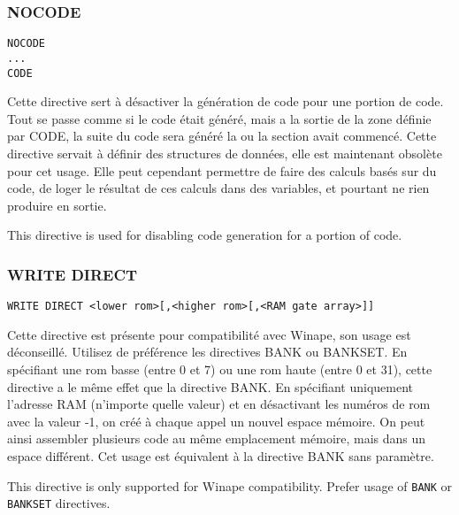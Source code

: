 \subsubsection{NOCODE}
\begin{verbatim}
NOCODE
...
CODE
\end{verbatim}

\begin{xfr}
  Cette directive sert à désactiver la génération de code pour une portion de code. Tout se passe comme si le code était généré, mais a la sortie de la zone définie par CODE, la suite du code sera généré la ou la section avait commencé.
  Cette directive servait à définir des structures de données, elle est maintenant obsolète pour cet usage. Elle peut cependant permettre de faire des calculs basés sur du code, de loger le résultat de ces calculs dans des variables, et pourtant ne rien produire en sortie.
\end{xfr}

\begin{xen}
This directive is used for disabling code generation for a portion of code.
\end{xen}

\subsubsection{WRITE DIRECT}

\begin{verbatim}
WRITE DIRECT <lower rom>[,<higher rom>[,<RAM gate array>]]
\end{verbatim}

\begin{xfr}
Cette directive est présente pour compatibilité avec Winape, son usage est déconseillé. Utilisez de préférence les directives BANK ou BANKSET.
En spécifiant une rom basse (entre 0 et 7) ou une rom haute (entre 0 et 31), cette directive a le même effet que la directive BANK.
En spécifiant uniquement l'adresse RAM (n'importe quelle valeur) et en désactivant les numéros de rom avec la valeur -1, on créé à chaque appel un nouvel espace mémoire. On peut ainsi assembler plusieurs code au même emplacement mémoire, mais dans un espace différent. Cet usage est équivalent à la directive BANK sans paramètre.

\end{xfr}

\begin{xen}
This directive is only supported for Winape compatibility. Prefer usage of \texttt{BANK} or \texttt{BANKSET} directives.

\end{xen}


